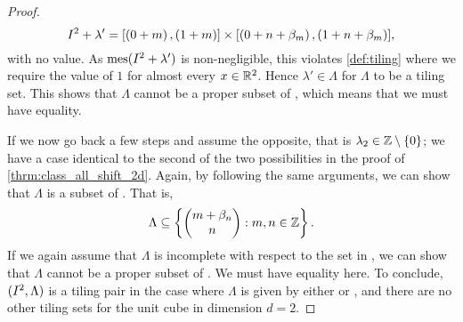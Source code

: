 \documentclass[../thesis.tex]{subfiles}
\begin{document}
\begin{proof}
    \begin{equation*}
        I^2 + \lambda' = [\left(0+m\right),\left(1+m\right)]\times [\left(0+n+\beta_m\right),\left(1+n+\beta_m\right)], 
    \end{equation*}
    with no value. As $\operatorname{mes}(I^2 + \lambda')$ is non-negligible, this violates \cref{def:tiling} where we require the value of $1$ for almost every $x\in \mathbb{R}^2$. Hence $\lambda'\in \Lambda$ for $\Lambda$ to be a tiling set. This shows that $\Lambda$ cannot be a proper subset of , which means that we must have equality.%
    
    If we now go back a few steps and assume the opposite, that is $\lambda_2 \in \mathbb{Z}\setminus\{0\}$; we have a case identical to the second of the two possibilities in the proof of \cref{thrm:class_all_shift_2d}. Again, by following the same arguments, we can show that $\Lambda$ is a subset of . That is,
    \begin{equation*}  %
        \Lambda \subseteq \braqMed{\begin{pmatrix} m +\beta_n \\ n\end{pmatrix} : m,n \in \Z}.
    \end{equation*}
    If we again assume that $\Lambda$ is incomplete with respect to the set in , we can show that $\Lambda$ cannot be a proper subset of . We must have equality here. To conclude, $(I^2, \Lambda)$ is a tiling pair in the case where $\Lambda$ is given by either  or , and there are no other tiling sets for the unit cube in dimension $d=2$.
\end{proof}
\end{document}
